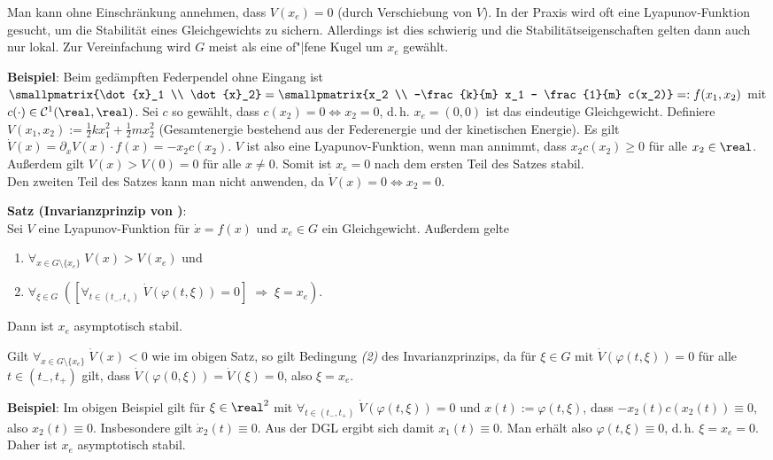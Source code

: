 Man kann ohne Einschränkung annehmen, dass $V(x_e) = 0$ (durch Verschiebung von $V$).
In der Praxis wird oft eine Lyapunov-Funktion gesucht, um die Stabilität eines Gleichgewichts
zu sichern.
Allerdings ist dies schwierig und die Stabilitätseigenschaften gelten dann auch nur lokal.
Zur Vereinfachung wird $G$ meist als eine of"|fene Kugel um $x_e$ gewählt.

\textbf{Beispiel}:
Beim gedämpften Federpendel ohne Eingang ist
$\smallpmatrix{\dot{x}_1 \\ \dot{x}_2} =
\smallpmatrix{x_2 \\ -\frac{k}{m} x_1 - \frac{1}{m} c(x_2)}
=: f(x_1, x_2)$ mit $c(\cdot) \in \C^1(\real, \real)$.
Sei $c$ so gewählt, dass $c(x_2) = 0 \iff x_2 = 0$,
d.\,h. $x_e = (0, 0)$ ist das eindeutige Gleichgewicht.
Definiere $V(x_1, x_2) := \frac{1}{2} kx_1^2 + \frac{1}{2} mx_2^2$
(Gesamtenergie bestehend aus der Federenergie und der kinetischen Energie).
Es gilt $\dot{V}(x) = \partial_x V(x) \cdot f(x) = -x_2 c(x_2)$.
$V$ ist also eine Lyapunov-Funktion,
wenn man annimmt, dass $x_2 c(x_2) \ge 0$ für alle $x_2 \in \real$.
Außerdem gilt $V(x) > V(0) = 0$ für alle $x \not= 0$.
Somit ist $x_e = 0$ nach dem ersten Teil des Satzes stabil.\\
Den zweiten Teil des Satzes kann man nicht anwenden, da $\dot{V}(x) = 0 \iff x_2 = 0$.

\linie

\textbf{Satz (Invarianzprinzip von )}:\\
Sei $V$ eine Lyapunov-Funktion für $\dot{x} = f(x)$ und $x_e \in G$ ein Gleichgewicht.
Außerdem gelte
\begin{enumerate}
    \item
    $\forall_{x \in G \setminus \{x_e\}}\; V(x) > V(x_e)$ und
    
    \item
    $\forall_{\xi \in G}\;
    ([\forall_{t \in (t_-, t_+)}\; \dot{V}(\varphi(t, \xi)) = 0] \;\Rightarrow\;
    \xi = x_e)$.
\end{enumerate}
Dann ist $x_e$ asymptotisch stabil.

Gilt $\forall_{x \in G \setminus \{x_e\}}\; \dot{V}(x) < 0$ wie im obigen Satz,
so gilt Bedingung \emph{(2)} des Invarianzprinzips, da für $\xi \in G$ mit
$\dot{V}(\varphi(t, \xi)) = 0$ für alle $t \in (t_-, t_+)$ gilt, dass
$\dot{V}(\varphi(0, \xi)) = \dot{V}(\xi) = 0$, also $\xi = x_e$.

\linie
\pagebreak

\textbf{Beispiel}:
Im obigen Beispiel gilt für $\xi \in \real^2$ mit
$\forall_{t \in (t_-, t_+)}\; \dot{V}(\varphi(t, \xi)) = 0$ und $x(t) := \varphi(t, \xi)$, dass
$-x_2(t) c(x_2(t)) \equiv 0$, also $x_2(t) \equiv 0$.
Insbesondere gilt $\dot{x}_2(t) \equiv 0$.
Aus der DGL ergibt sich damit $x_1(t) \equiv 0$.
Man erhält also $\varphi(t, \xi) \equiv 0$, d.\,h. $\xi = x_e = 0$.
Daher ist $x_e$ asymptotisch stabil.

